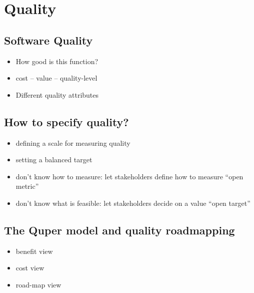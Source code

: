 
\chapter{Quality}

\section{Software Quality}
\begin{itemize}
  \item How good is this function?
  \item cost -- value -- quality-level
  \item Different quality attributes
\end{itemize}

\section{How to specify quality?}

\begin{itemize}
  \item defining a scale for measuring quality
  \item setting a balanced target
  \item don't know how to measure: let stakeholders define how to measure ``open metric''
  \item don't know what is feasible: let stakeholders decide on a value ``open target''
\end{itemize}

\section{The Quper model and quality roadmapping}

\begin{itemize}
  \item benefit view
  \item cost view
  \item road-map view
\end{itemize}
